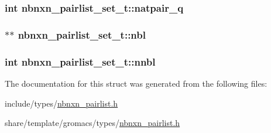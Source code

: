 \hypertarget{structnbnxn__pairlist__set__t_ae6b529725cb3a4a2a7265beb60479430}{
\subsubsection[{natpair\-\_\-q}]{\setlength{\rightskip}{0pt plus 5cm}int {\bf nbnxn\-\_\-pairlist\-\_\-set\-\_\-t\-::natpair\-\_\-q}}}\label{structnbnxn__pairlist__set__t_ae6b529725cb3a4a2a7265beb60479430}
\hypertarget{structnbnxn__pairlist__set__t_ae082333a5bb2e59f859b2db044ebec27}{
\subsubsection[{nbl}]{ $\ast$$\ast$ {\bf nbnxn\-\_\-pairlist\-\_\-set\-\_\-t\-::nbl}}}\label{structnbnxn__pairlist__set__t_ae082333a5bb2e59f859b2db044ebec27}
\hypertarget{structnbnxn__pairlist__set__t_aed2502691ae20f7d1ae63557c14fd05f}{
\subsubsection[{nnbl}]{\setlength{\rightskip}{0pt plus 5cm}int {\bf nbnxn\-\_\-pairlist\-\_\-set\-\_\-t\-::nnbl}}}\label{structnbnxn__pairlist__set__t_aed2502691ae20f7d1ae63557c14fd05f}


\-The documentation for this struct was generated from the following files\-:\begin{DoxyCompactItemize}
\item 
include/types/\hyperlink{include_2types_2nbnxn__pairlist_8h}{nbnxn\-\_\-pairlist.\-h}\item 
share/template/gromacs/types/\hyperlink{share_2template_2gromacs_2types_2nbnxn__pairlist_8h}{nbnxn\-\_\-pairlist.\-h}\end{DoxyCompactItemize}

